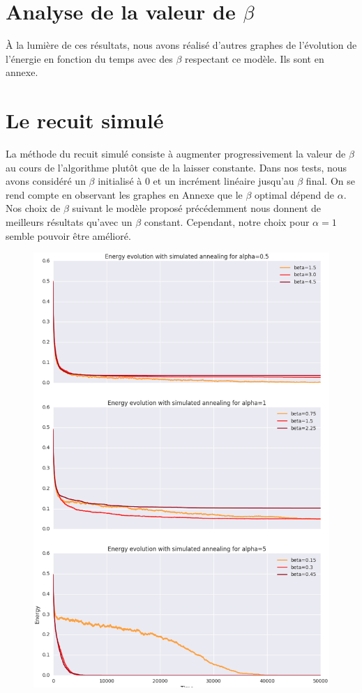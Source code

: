 \documentclass[twocolumn]{article}
\begin{document}
	\section{Analyse de la valeur de $\beta$}
		À la lumière de ces résultats, nous avons réalisé d'autres graphes de l'évolution de l'énergie en fonction du temps avec des $\beta$ respectant ce modèle. Ils sont en annexe.
	\section{Le recuit simulé}
		La méthode du recuit simulé consiste à augmenter progressivement la valeur de $\beta$ au cours de l'algorithme plutôt que de la laisser constante. Dans nos tests, nous avons considéré un $\beta$ initialisé à 0 et un incrément linéaire jusqu'au $\beta$ final.
		On se rend compte en observant les graphes en Annexe que le $\beta$ optimal dépend de $\alpha$.  Nos choix de $\beta$ suivant le modèle proposé précédemment nous donnent de meilleurs résultats qu'avec un $\beta$ constant. Cependant, notre choix pour $\alpha = 1$ semble pouvoir être amélioré.
		
		\begin{figure}
		\includegraphics[width=\columnwidth]{../tobekept/ex1_sim_1683536997971113732-r.png}
		\end{figure}
		
\end{document}
